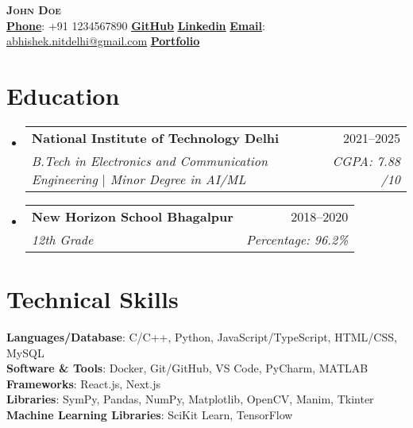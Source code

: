\documentclass[a4paper, 10.75pt]{article}
\makeatletter
\newcommand{\resumeSubheading}[4]{
  \vspace{-2pt}\item
    \begin{tabular*}{0.97\textwidth}[t]{l@{\extracolsep{\fill}}r}
      \textbf{#1} & #2 \\
      \textit{\small#3} & \textit{\small #4} \\
    \end{tabular*}\vspace{-8pt}
}
\newcommand{\resumeSubHeadingListStart}{\begin{itemize}[leftmargin=0.15in, label={}]}
\newcommand{\resumeSubHeadingListEnd}{\end{itemize}}
\makeatother
\begin{document}
\begin{center}
    \textbf{\Huge \scshape John Doe} \\ \vspace{8pt}
    \small 
    \textbf{\underline{Phone}}: {+91 1234567890} \hspace{12pt} %
    \href{https://github.com/abhiphile}{\textbf{\underline{GitHub}}} \hspace{12pt} %
    \href{https://www.linkedin.com/in/abhishek-kumar-nitdelhi/}{\textbf{\underline{Linkedin}}} \hspace{12pt} %
    \textbf{\underline{Email}}: 
    \href{mailto:abhishek.nitdelhi@gmail.com}
    {\underline{abhishek.nitdelhi@gmail.com}} \hspace{12pt} 
    \href{https://abhishek-portfolio-chi.vercel.app/}{{\textbf{\underline{Portfolio}}}}
\end{center}


\section{Education}
\resumeSubHeadingListStart

\resumeSubheading
{National Institute of Technology Delhi}{2021--2025}
{B.Tech in Electronics and Communication Engineering
$|$ Minor Degree in AI/ML}{CGPA: 7.88 /10}

\resumeSubheading
{New Horizon School Bhagalpur}{2018--2020}
{12th Grade}{Percentage: 96.2\%}

\resumeSubHeadingListEnd


\section{Technical Skills}
 \begin{itemize}[leftmargin=0.15in, label={}]
    \small{\item{
    
     \textbf{Languages/Database}{: C/C++, Python, JavaScript/TypeScript, HTML/CSS, MySQL} \\
     \textbf{Software \& Tools}{: Docker, Git/GitHub, VS Code, PyCharm, MATLAB}\\
      \textbf{Frameworks}{: React.js, Next.js} \\
      \textbf{Libraries}{: SymPy, Pandas, NumPy, Matplotlib, OpenCV, Manim, Tkinter }\\
     \textbf{Machine Learning Libraries}{: SciKit Learn, TensorFlow}
    }}
 \end{itemize}
\end{document}
